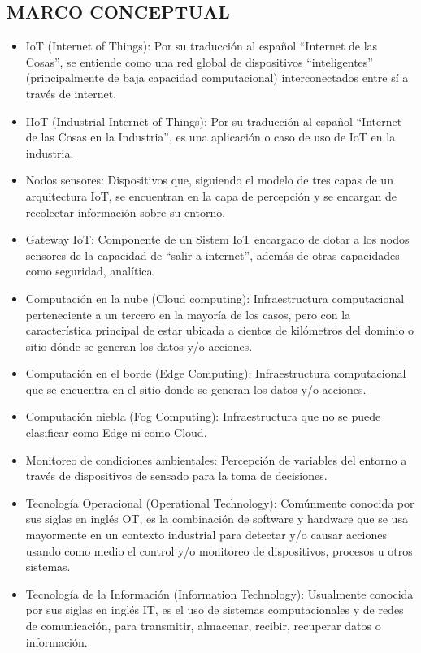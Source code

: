 \documentclass[stu,12pt,floatsintext]{apa7}
\begin{document}
	\subsection{MARCO CONCEPTUAL}
		\begin{itemize}
		\item IoT (Internet of Things): Por su traducción al español ``Internet de las Cosas'', se entiende como una red global de dispositivos ``inteligentes'' (principalmente de baja capacidad computacional) interconectados entre sí a través de internet.
		\item IIoT (Industrial Internet of Things): Por su traducción al español ``Internet de las Cosas en la Industria'', es una aplicación o caso de uso de IoT en la industria.
		\item Nodos sensores: Dispositivos que, siguiendo el modelo de tres capas de un arquitectura IoT, se encuentran en la capa de percepción y se encargan de recolectar información sobre su entorno.
		\item Gateway IoT: Componente de un Sistem IoT encargado de dotar a los nodos sensores de la capacidad de ``salir a internet'', además de otras capacidades como seguridad, analítica.
		\item Computación en la nube (Cloud computing): Infraestructura computacional perteneciente a un tercero en la mayoría de los casos, pero con la característica principal de estar ubicada a cientos de kilómetros del dominio o sitio dónde se generan los datos y/o acciones.
		\item Computación en el borde (Edge Computing): Infraestructura computacional que se encuentra en el sitio donde se generan los datos y/o acciones.
		\item Computación niebla (Fog Computing): Infraestructura que no se puede clasificar como Edge ni como Cloud.
		\item Monitoreo de condiciones ambientales: Percepción de variables del entorno a través de dispositivos de sensado para la toma de decisiones.
		\item Tecnología Operacional (Operational Technology): Comúnmente conocida por sus siglas en inglés OT, es la combinación de software y hardware que se usa mayormente en un contexto industrial para detectar y/o causar acciones usando como medio el control y/o monitoreo de dispositivos, procesos u otros sistemas.
		\item Tecnología de la Información (Information Technology):  Usualmente conocida por sus siglas en inglés IT, es el uso de sistemas computacionales y de redes de comunicación, para transmitir, almacenar, recibir, recuperar datos o información.

\end{itemize}
\end{document}
